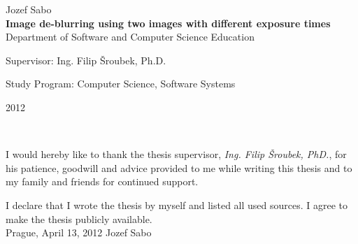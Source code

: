 \documentclass[12pt,notitlepage]{report}
\begin{document}
\begin{titlepage}
\begin{center}
\vspace{15mm}

{\Large Jozef Sabo}\\ %
\vspace{5mm}
{\Large\bf Image de-blurring using two images with different exposure times}\\
\vspace{5mm}
Department of Software and Computer Science Education\\ %
\end{center}
\vspace{17mm}

\begin{center}
\large
\noindent Supervisor: Ing. Filip Šroubek, Ph.D.
\vspace{1mm}

\noindent Study Program: Computer Science, Software Systems
\end{center}

\vspace{8mm}


\begin{center}
2012 %
\end{center}

\end{titlepage} %
\pagestyle{plain}
\normalsize %
\setcounter{page}{2} %
\ \vspace{10mm}

\noindent I would hereby like to thank the thesis supervisor, {\em Ing. Filip Šroubek, PhD.}, for his patience, goodwill and advice provided to me while writing this thesis and to my family and friends for continued support.

\vspace{\fill} %
\noindent I declare that I wrote the thesis by myself and listed all used sources. I agree to make the thesis publicly available. \\[2cm]

\noindent Prague, April 13, 2012 \hspace{\fill}Jozef Sabo\\ %

\end{document}
